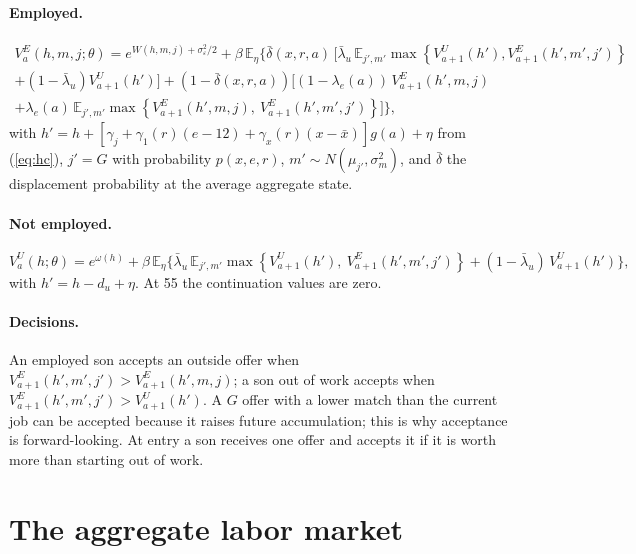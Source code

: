 \documentclass[11pt]{article}
\newcommand{\E}{\mathbb{E}}
\newcommand{\1}{\mathbf{1}}
\begin{document}
\paragraph{Employed.}
\begin{multline}
V^E_a(h, m, j; \theta) = e^{W(h,m,j) + \sigma_\varepsilon^2/2} + \beta\, \E_{\eta}\Big\{ \bar\delta(x,r,a)\, \Big[
\bar\lambda_u\, \E_{j', m'} \max\left\{ V^U_{a+1}(h'), V^E_{a+1}(h', m', j') \right\} \\
+ (1 - \bar\lambda_u) V^U_{a+1}(h') \Big] + \left(1 - \bar\delta(x,r,a)\right) \Big[ (1 - \lambda_e(a))\,
V^E_{a+1}(h', m, j) \\
+ \lambda_e(a)\, \E_{j', m'} \max\left\{ V^E_{a+1}(h', m, j),\ V^E_{a+1}(h', m', j') \right\} \Big] \Big\},
\end{multline}
with $h' = h + [\gamma_j + \gamma_1(r) (e - 12) + \gamma_x(r) (x - \bar x)] g(a) + \eta$ from (\ref{eq:hc}), $j' = G$ with probability $p(x, e, r)$,
$m' \sim N(\mu_{j'}, \sigma_m^2)$, and $\bar\delta$ the displacement probability at the average aggregate state.

\paragraph{Not employed.}
\begin{equation}
V^U_a(h; \theta) = e^{\omega(h)} + \beta\, \E_{\eta}\Big\{ \bar\lambda_u\, \E_{j', m'} \max\left\{ V^U_{a+1}(h'),\
V^E_{a+1}(h', m', j') \right\} + (1 - \bar\lambda_u)\, V^U_{a+1}(h') \Big\},
\end{equation}
with $h' = h - d_u + \eta$. At 55 the continuation values are zero.

\paragraph{Decisions.} An employed son accepts an outside offer when $V^E_{a+1}(h', m', j') > V^E_{a+1}(h', m, j)$; a son
out of work accepts when $V^E_{a+1}(h', m', j') > V^U_{a+1}(h')$. A $G$ offer with a lower match than the current job can
be accepted because it raises future accumulation; this is why acceptance is forward-looking. At entry a son receives one
offer and accepts it if it is worth more than starting out of work.

\section{The aggregate labor market}\label{sec:agg}
\end{document}
